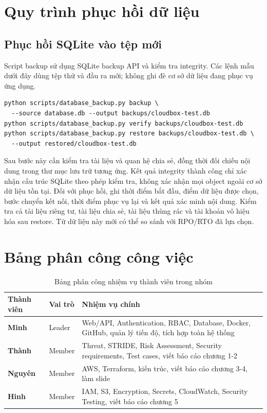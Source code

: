 \chapter{Quy trình phục hồi dữ liệu}
\section{Phục hồi SQLite vào tệp mới}
Script backup sử dụng SQLite backup API và kiểm tra integrity. Các lệnh mẫu dưới đây dùng tệp thử và đầu ra mới; không ghi đè cơ sở dữ liệu đang phục vụ ứng dụng.
\begin{verbatim}
python scripts/database_backup.py backup \
  --source database.db --output backups/cloudbox-test.db
python scripts/database_backup.py verify backups/cloudbox-test.db
python scripts/database_backup.py restore backups/cloudbox-test.db \
  --output restored/cloudbox-test.db
\end{verbatim}
Sau bước này cần kiểm tra tài liệu và quan hệ chia sẻ, đồng thời đối chiếu nội dung trong thư mục lưu trữ tương ứng. Kết quả integrity thành công chỉ xác nhận cấu trúc SQLite theo phép kiểm tra, không xác nhận mọi object ngoài cơ sở dữ liệu tồn tại.
Đối với phục hồi, ghi thời điểm bắt đầu, điểm dữ liệu được chọn, bước chuyển kết nối, thời điểm phục vụ lại và kết quả xác minh nội dung. Kiểm tra cả tài liệu riêng tư, tài liệu chia sẻ, tài liệu thùng rác và tài khoản vô hiệu hóa sau restore. Từ dữ liệu này mới có thể so sánh với RPO/RTO đã lựa chọn.

\phantomsection
{}
\chapter*{Bảng phân công công việc}
\begin{table}[htbp]
\centering
\caption{Bảng phân công nhiệm vụ thành viên trong nhóm}
\label{tab:phan-cong-nhiem-vu}
\begin{tabular}{|p{2.5cm}|p{3.5cm}|p{9cm}|}
\hline
\textbf{Thành viên} & \textbf{Vai trò} & \textbf{Nhiệm vụ chính} \\ \hline
\textbf{Minh} & Leader & Web/API, Authentication, RBAC, Database, Docker, GitHub, quản lý tiến độ, tích hợp toàn hệ thống \\ \hline
\textbf{Thành} & Member & Threat, STRIDE, Risk Assessment, Security requirements, Test cases, viết báo cáo chương 1-2\\ \hline
\textbf{Nguyên} & Member & AWS, Terraform, kiến trúc, viết báo cáo chương 3-4, làm slide \\ \hline
\textbf{Hinh} & Member & IAM, S3, Encryption, Secrets, CloudWatch, Security Testing, viết báo cáo chương 5\\ \hline
\end{tabular}
\end{table}



